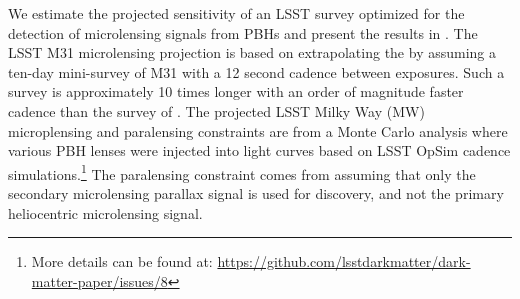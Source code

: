 
We estimate the projected sensitivity of an LSST survey optimized for the detection of microlensing signals from PBHs and present the results in .
The LSST M31 microlensing projection is based on extrapolating the \citet{1701.02151} by assuming a ten-day mini-survey of M31 with a 12 second cadence between exposures.
Such a survey is approximately 10 times longer with an order of magnitude faster cadence than the survey of \citet{1701.02151}.
The projected LSST Milky Way (MW) microplensing and paralensing constraints are from a Monte Carlo analysis where various PBH lenses were injected into light curves based on LSST OpSim cadence simulations.\footnote{More details can be found at: \url{https://github.com/lsstdarkmatter/dark-matter-paper/issues/8}}
The paralensing constraint comes from assuming that only the secondary microlensing parallax signal is used for discovery, and not the primary heliocentric microlensing signal.

\begin{comment}
        The microlensing and paralensing signals for a $23^\mathrm{rd}$ magnitude sourcestar in the bulge being lensed by a $50\,\mathrm{M}_\odot$ black hole. 
        For events with an Einstein crossing time much less than a year (i.e., approximately solar mass and below), the microlensing magnification will appear symmetric in time (orange curve).
        For microlensing events lasting on the order of a year or more (i.e., approximately solar mass and above), the lensing geometry changes as Earth orbits the Sun, leading to a parallax effect.
        This paralensing signal has a period of a year, with the phase determined by the coordinates of the source star, making it robust to other astrophysical systematics.
        It is also possible to detect binary dark matter, and extend the mass range to planet mass compact dark matter, via the source passing through one of the gravitational lensing caustic curves formed by the binary lens.
        The green curve on top of the heliocentric orange curve is representative of a typical planetary microlensing event caused by a caustic crossing.
        While LSST can measure these events if lucky, we will rely on LSST to detect the heliocentric microlensing event and trigger targeted follow-up higher cadence observations to measure the planetary microlensing event.
        The black data points are representative of extending the LSST wide-fast-deep cadence into the Galactic plane. \WAD{Need to update this figure with the LSST WFD cadence.}
        \emph{[Right]}
        A cartoon diagram of paralensing. 
        For microlensing events lasting on the order of a year or more the lensing geometry changes as Earth orbits the Sun, leading to a parallax effect.
        \Contributors{Will D., PALS Collaboration}
\end{comment}




